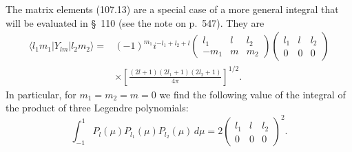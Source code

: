 The matrix elements (107.13) are a special case of a more general integral that will be evaluated in \S~110 (see the note on p.~547). They are
\begin{equation}
 \begin{aligned}
 \langle l_1m_1|Y_{lm}|l_2m_2\rangle={}&(-1)^{m_1}i^{-l_1+l_2+l}
 \begin{pmatrix}l_1&l&l_2\\-m_1&m&m_2\end{pmatrix}
 \begin{pmatrix}l_1&l&l_2\\0&0&0\end{pmatrix}\\
 &\times\left[\frac{(2l+1)(2l_1+1)(2l_2+1)}{4\pi}\right]^{1/2}.
 \end{aligned}
 \tag{107.14}
\end{equation}
In particular, for $m_1=m_2=m=0$ we find the following value of the integral of the product of three Legendre polynomials:
\begin{equation}
 \int_{-1}^{1}P_l(\mu)P_{l_1}(\mu)P_{l_2}(\mu)\,d\mu=
 2\begin{pmatrix}l_1&l&l_2\\0&0&0\end{pmatrix}^{2}.
 \tag{107.15}
\end{equation}

